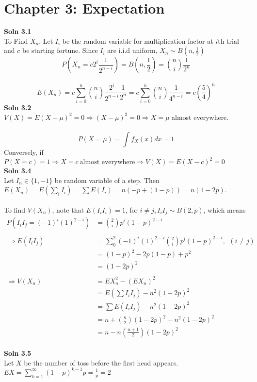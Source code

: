 \documentclass{article}
\newcommand{\SOL}[2]{%
  \textbf{Soln #1}\\%
}
\begin{document}
\section*{Chapter 3: Expectation}
\SOL{3.1}
\\
To Find $X_n$, Let $I_i$ be the random variable for multiplication factor at $i$th trial and $c$ be starting fortune. Since $I_i$ are i.i.d uniform, $X_n \sim B(n, \frac{1}{2})$ \\
$$ P(X_n = c2^i \frac{1}{2^{n-i}}) = B(n, \frac{1}{2})  = \binom{n}{i} \frac{1}{2^n} $$ \\
$$ E(X_n) = c \sum^n_{i=0} \binom{n}{i} \frac{2^i}{2^{n-i}}\frac{1}{2^n} = c \sum^n_{i=0} \binom{n}{i} \frac{1}{4^{n-i}} = c (\frac{5}{4})^n$$
\SOL{3.2}
\\
$V(X) = E(X-\mu)^2 = 0 \Rightarrow (X-\mu)^2 = 0 \Rightarrow X = \mu$  almost everywhere. \\ \\
$$ P(X=\mu) = \int f_X(x) dx = 1$$ 
Conversely, if $P(X=c) = 1 \Rightarrow X=c \ \mbox{almost everywhere} \Rightarrow V(X) = E(X- c)^2 = 0$ \\
\SOL{3.4}
\\
Let $I_n \in \{1, -1\}$ be random variable of a step. Then $E(X_n) = E(\sum_i I_i) = \sum E(I_i) = n(-p + (1-p)) = n(1-2p)$. \\ \\
To find $V(X_n)$, note that $E(I_iI_i) = 1$, for $i \neq j, I_iI_j \sim B(2, p)$, which means 
\begin{align*}
 P(I_iI_j = (-1)^i(1)^{2-i}) & = \binom{2}{i}p^i(1-p)^{2-i} \\ \\
    \Longrightarrow E(I_iI_j) &= \sum^2_0 (-1)^i(1)^{2-i} \binom{2}{i}p^i(1-p)^{2-i}, \ \ (i \neq j) \\
    &= (1-p)^2 - 2p(1-p) + p^2  \\
    &= (1-2p)^2 \\ \\
    \Longrightarrow V(X_n) &= EX^2_n - (EX_n)^2 \\
       &= E(\sum I_iI_j) - n^2(1-2p)^2 \\
       &= \sum E(I_iI_j) - n^2(1-2p)^2 \\
       &= n + \binom{n}{2}(1-2p)^2 - n^2(1-2p)^2 \\
       &= n - n(\frac{n+1}{2})(1-2p)^2
\end{align*}
\\
\SOL{3.5}
\\
Let $X$ be the number of toss before the first head appears. $EX = \sum^{\infty}_{k = 1} (1-p)^{k - 1}p =  \frac{1}{p} = 2$ 
\end{document}
